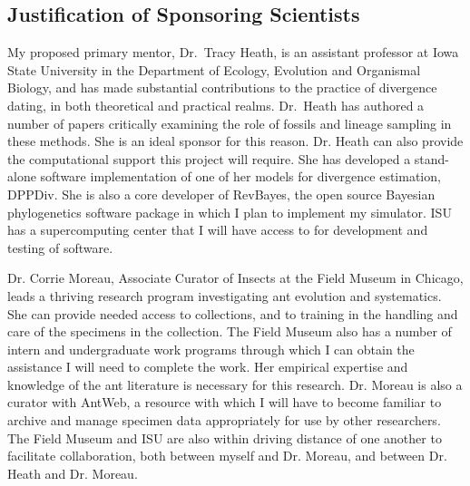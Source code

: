 \documentclass[]{article}
\begin{document}
\subsection*{Justification of Sponsoring Scientists}
    My proposed primary mentor, Dr.\ Tracy Heath, is an assistant professor at Iowa State University in the Department of Ecology, Evolution and Organismal Biology, and has made substantial contributions to the practice of divergence dating, in both theoretical and practical realms. Dr.\ Heath has authored a number of papers critically examining the role of fossils and lineage sampling in these methods. She is an ideal sponsor for this reason. Dr. Heath can also provide the computational support this project will require. She has developed a stand-alone software implementation of one of her models for divergence estimation, DPPDiv. She is also a core developer of RevBayes, the open source Bayesian phylogenetics software package in which I plan to implement my simulator. ISU has a supercomputing center that I will have access to for development and testing of software.  \par
Dr. Corrie Moreau, Associate Curator of Insects at the Field Museum in Chicago, leads a thriving research program investigating ant evolution and systematics. She can provide needed access to collections, and to training in the handling and care of the specimens in the collection.  The Field Museum also has a number of intern and undergraduate work programs through which I can obtain the assistance I will need to complete the work. Her empirical expertise and knowledge of the ant literature is necessary for this research.  Dr. Moreau is also a curator with AntWeb, a resource with which I will have to become familiar to archive and manage specimen data appropriately for use by other researchers. The Field Museum and ISU are also within driving distance of one another to facilitate collaboration, both between myself and Dr. Moreau, and between Dr. Heath and Dr. Moreau. \par
\end{document}
